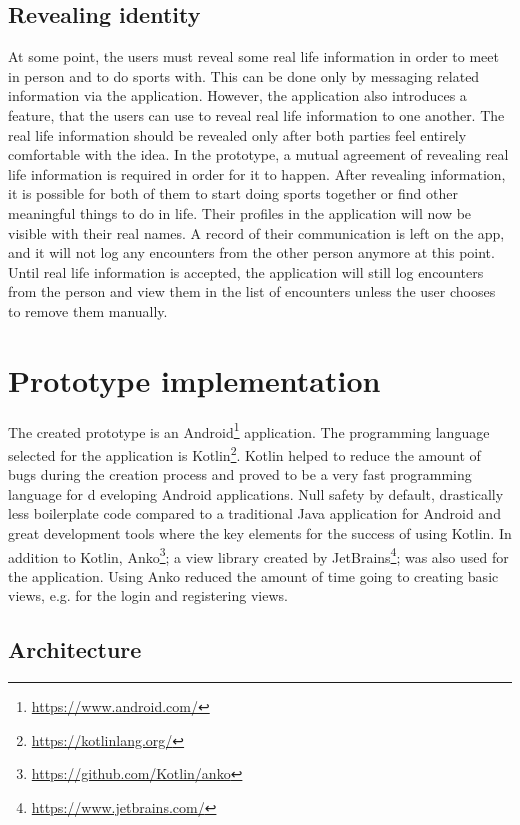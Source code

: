 \subsection{Revealing identity}

At some point, the users must reveal some real life information in order to meet in person and to do sports with. This can be done only by messaging related information via the application. However, the application also introduces a feature, that the users can use to reveal real life information to one another. The real life information should be revealed only after both parties feel entirely comfortable with the idea. In the prototype, a mutual agreement of revealing real life information is required in order for it to happen. After revealing information, it is possible for both of them to start doing sports together or find other meaningful things to do in life. Their profiles in the application will now be visible with their real names. A record of their communication is left on the app, and it will not log any encounters from the other person anymore at this point. Until real life information is accepted, the application will still log encounters from the person and view them in the list of encounters unless the user chooses to remove them manually.

\section{Prototype implementation}

The created prototype is an Android\footnote{\url{https://www.android.com/}} application. The programming language selected for the application is Kotlin\footnote{\url{https://kotlinlang.org/}}. Kotlin helped to reduce the amount of bugs during the creation process and proved to be a very fast programming language for d	eveloping Android applications. Null safety by default, drastically less boilerplate code compared to a traditional Java application for Android and great development tools where the key elements for the success of using Kotlin. In addition to Kotlin, Anko\footnote{\url{https://github.com/Kotlin/anko}}; a view library created by JetBrains\footnote{\url{https://www.jetbrains.com/}}; was also used for the application. Using Anko reduced the amount of time going to creating basic views, e.g. for the login and registering views.

\subsection{Architecture}

